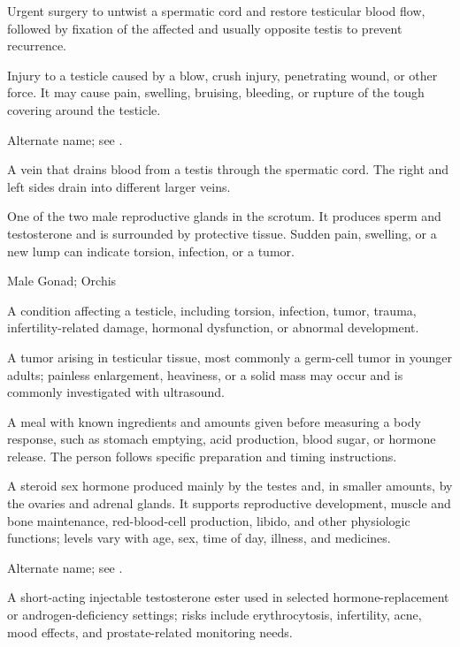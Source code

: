  Urgent surgery to untwist a spermatic cord and restore testicular blood flow, followed by fixation of the affected and usually opposite testis to prevent recurrence.

 Injury to a testicle caused by a blow, crush injury, penetrating wound, or other force. It may cause pain, swelling, bruising, bleeding, or rupture of the tough covering around the testicle.

 Alternate name; see .

 A vein that drains blood from a testis through the spermatic cord. The right and left sides drain into different larger veins.

 One of the two male reproductive glands in the scrotum. It produces sperm and testosterone and is surrounded by protective tissue. Sudden pain, swelling, or a new lump can indicate torsion, infection, or a tumor.

\synonyms
Male Gonad; Orchis

 A condition affecting a testicle, including torsion, infection, tumor, trauma, infertility-related damage, hormonal dysfunction, or abnormal development.

 A tumor arising in testicular tissue, most commonly a germ-cell tumor in younger adults; painless enlargement, heaviness, or a solid mass may occur and is commonly investigated with ultrasound.

 A meal with known ingredients and amounts given before measuring a body response, such as stomach emptying, acid production, blood sugar, or hormone release. The person follows specific preparation and timing instructions.

 A steroid sex hormone produced mainly by the testes and, in smaller amounts, by the ovaries and adrenal glands. It supports reproductive development, muscle and bone maintenance, red-blood-cell production, libido, and other physiologic functions; levels vary with age, sex, time of day, illness, and medicines.

 Alternate name; see .

 A short-acting injectable testosterone ester used in selected hormone-replacement or androgen-deficiency settings; risks include erythrocytosis, infertility, acne, mood effects, and prostate-related monitoring needs.

